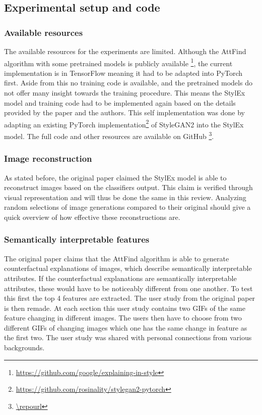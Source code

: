 \subsection{Experimental setup and code}
\subsubsection{Available resources}
The available resources for the experiments are limited. Although the AttFind algorithm with some pretrained models is publicly available \footnote{\url{https://github.com/google/explaining-in-style}}, the current implementation is in TensorFlow meaning it had to be adapted into PyTorch first. Aside from this no training code is available, and the pretrained models do not offer many insight towards the training procedure. This means the StylEx model and training code had to be implemented again based on the details provided by the paper and the authors. This self implementation was done by adapting an existing PyTorch implementation\footnote{\url{https://github.com/rosinality/stylegan2-pytorch}} of StyleGAN2 into the StylEx model. The full code and other resources are available on GitHub \footnote{\url{\repourl}}.


\subsubsection{Image reconstruction}
As stated before, the original paper claimed the StylEx model is able to reconstruct images based on the classifiers output. This claim is verified through visual representation and will thus be done the same in this review. Analyzing random selections of image generations compared to their original should give a quick overview of how effective these reconstructions are.


\subsubsection{Semantically interpretable features}
The original paper claims that the AttFind algorithm is able to generate counterfactual explanations of images, which describe semantically interpretable attributes. If the counterfactual explanations are semantically interpretable attributes, these would have to be noticeably different from one another. To test this first the top 4 features are extracted. The user study from the original paper is then remade. At each section this user study contains two GIFs of the same feature changing in different images. The users then have to choose from two different GIFs of changing images which one has the same change in feature as the first two. The user study was shared with personal connections from various backgrounds.


